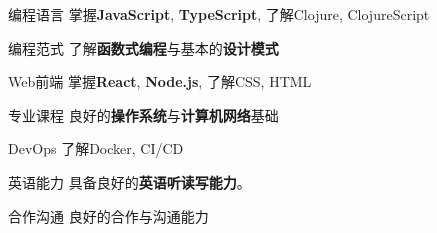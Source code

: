 

\begin{cvskills}

\cvskill
  {编程语言} %
  {掌握\textbf{JavaScript}, \textbf{TypeScript}, 了解Clojure, ClojureScript} %

\cvskill
{编程范式} %
{了解\textbf{函数式编程}与基本的\textbf{设计模式}} %

\cvskill
  {Web前端} %
  {掌握\textbf{React}, \textbf{Node.js}, 了解CSS, HTML} %

\cvskill
  {专业课程} %
  {良好的\textbf{操作系统}与\textbf{计算机网络}基础} %
  
\cvskill
    {DevOps} %
    {了解Docker, CI/CD} %

\cvskill
  {英语能力} %
  {具备良好的\textbf{英语听读写能力}。} %

\cvskill
  {合作沟通} %
  {良好的合作与沟通能力} %

\end{cvskills}
